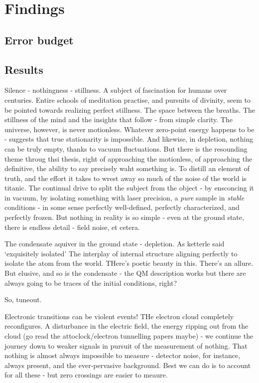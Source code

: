 \section{Findings}\label{sec:to-results}
\subsection{Error budget}\label{ssec:to-errs}
\subsection{Results}\label{ssec:to-findings}

Silence - nothingness - stillness. A subject of fascination for humans
over centuries. Entire schools of meditation practise, and pursuits of
divinity, seem to be pointed towards realizing perfect stillness. The
space between the breaths. The stillness of the mind and the insights
that follow - from simple clarity. The universe, however, is never
motionless. Whatever zero-point energy happens to be - suggests that
true stationarity is impossible. And likewise, in depletion, nothing can
be truly empty, thanks to vacuum fluctuations. But there is the
resounding theme throug thsi thesis, right of approaching the
motionless, of approaching the definitive, the ability to say precisely
waht something is. To distill an element of truth, and the effort it
takes to wrest away so much of the noise of the world is titanic. The
continual drive to split the subject from the object - by ensconcing it
in vacuum, by isolating something with laser precision, a \emph{pure}
sample in \emph{stable} conditions - in some sense perfectly
well-defined, perfectly characterized, and perfectly frozen. But nothing
in reality is so simple - even at the ground state, there is endless
detail - field noise, et cetera.

The condensate aquiver in the ground state - depletion. As ketterle said
`exquisitely isolated' The interplay of internal structure aligning
perfectly to isolate the atom from the world. THere's poetic beauty in
this. There's an allure. But elusive, and so is the condensate - the QM
description works but there are always going to be traces of the initial
conditions, right?

So, tuneout.

Electronic transitions can be violent events! THe electron cloud
completely reconfigures. A disturbance in the electric field, the energy
ripping out from the cloud (go read the attoclock/electron tunnelling
papers maybe) - we continue the journey down to weaker signals in
pursuit of the measurement of nothing. That nothing is almost always
impossible to measure - detector noise, for instance, always present,
and the ever-pervasive background. Best we can do is to account for all
these - but zero crossings are easier to meaure.

